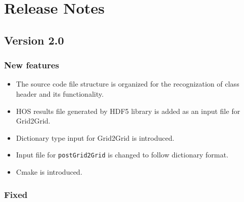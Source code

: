\pagebreak

\pagebreak
\section*{Release Notes}

\subsection*{Version 2.0}

\subsubsection*{New features}
\begin{itemize}	
	\item The source code file structure is organized for the recognization of class header and its functionality. 
	\item HOS results file generated by HDF5 library is added as an input file for Grid2Grid. 
	\item Dictionary type input for Grid2Grid is introduced. 
	\item Input file for \texttt{postGrid2Grid} is changed to follow dictionary format. 
	\item Cmake is introduced. 
\end{itemize}

\subsubsection*{Fixed}

\pagebreak


